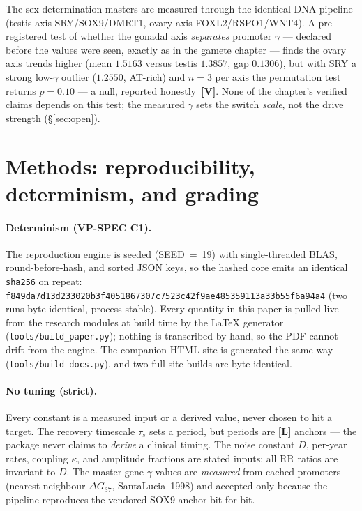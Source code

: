\documentclass[11pt]{article}
\newcommand{\gradeV}{\textcolor{verified}{\textbf{[V]}}}
\newcommand{\gradeL}{\textcolor{verified}{\textbf{[L]}}}
\begin{document}
The sex-determination masters are measured through the identical DNA pipeline (testis axis SRY/SOX9/DMRT1,
ovary axis FOXL2/RSPO1/WNT4). A pre-registered test of whether the gonadal axis \emph{separates} promoter
$\gamma$ --- declared before the values were seen, exactly as in the gamete chapter --- finds the ovary axis
trends higher (mean $1.5163$ versus testis
$1.3857$, gap $0.1306$), but with
SRY a strong low-$\gamma$ outlier ($1.2550$, AT-rich) and $n=3$ per axis the
permutation test returns $p=0.10$ --- a null, reported honestly~\gradeV{}.
None of the chapter's verified claims depends on this test; the measured $\gamma$ sets the switch \emph{scale},
not the drive strength (\S\ref{sec:open}).

\section{Methods: reproducibility, determinism, and grading}

\paragraph{Determinism (VP-SPEC C1).} The reproduction engine is seeded (SEED~=~19) with single-threaded
BLAS, round-before-hash, and sorted JSON keys, so the hashed core emits an identical \texttt{sha256} on
repeat: \texttt{f849da7d13d233020b3f4051867307c7523c42f9ae485359113a33b55f6a94a4} (two runs byte-identical, process-stable). Every quantity in this
paper is pulled live from the research modules at build time by the LaTeX generator
(\texttt{tools/build\_paper.py}); nothing is transcribed by hand, so the PDF cannot drift from the engine. The
companion HTML site is generated the same way (\texttt{tools/build\_docs.py}), and two full site builds are
byte-identical.

\paragraph{No tuning (strict).} Every constant is a measured input or a derived value, never chosen to hit a
target. The recovery timescale $\tau_s$ sets a period, but periods are \gradeL{} anchors --- the package never
claims to \emph{derive} a clinical timing. The noise constant $D$, per-year rates, coupling $\kappa$, and
amplitude fractions are stated inputs; all RR ratios are invariant to $D$. The master-gene $\gamma$ values are
\emph{measured} from cached promoters (nearest-neighbour $\Delta G_{37}$, SantaLucia~1998) and accepted only
because the pipeline reproduces the vendored SOX9 anchor bit-for-bit.
\end{document}
